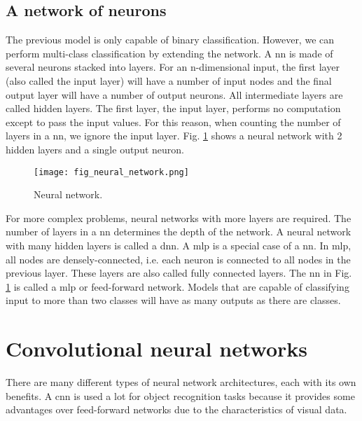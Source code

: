 \subsection{A network of neurons}
The previous model is only capable of binary classification. However, we can perform multi-class classification by extending the network. A \acrfull{nn} is made of several neurons stacked into layers. For an n-dimensional input, the first layer (also called the input layer) will have a number of input nodes and the final output layer will have a number of output neurons. All intermediate layers are called hidden layers. The first layer, the input layer, performs no computation except to pass the input values. For this reason, when counting the number of layers in a \acrshort{nn}, we ignore the input layer. Fig. \ref{fig:neural_network} shows a neural network with 2 hidden layers and a single output neuron. 
\begin{figure}[ht]
    \begin{center}
    \texttt{[image: fig\_neural\_network.png]}
    \caption{Neural network.}
    \label{fig:neural_network}
    \end{center}
\end{figure}

For more complex problems, neural networks with more layers are required. The number of layers in a \acrshort{nn} determines the depth of the network. A neural network with many hidden layers is called a \acrfull{dnn}. 
A \acrfull{mlp} is a special case of a \acrshort{nn}. In \acrshort{mlp}, all nodes are densely-connected, i.e. each neuron is connected to all nodes in the previous layer. These layers are also called fully connected layers. The \acrshort{nn} in Fig. \ref{fig:neural_network} is called a \acrshort{mlp} or feed-forward network. Models that are capable of classifying input to more than two classes will have as many outputs as there are classes.

\section{Convolutional neural networks}
There are many different types of neural network architectures, each with its own benefits. A \acrfull{cnn} is used a lot for object recognition tasks because it provides some advantages over feed-forward networks due to the characteristics of visual data.

